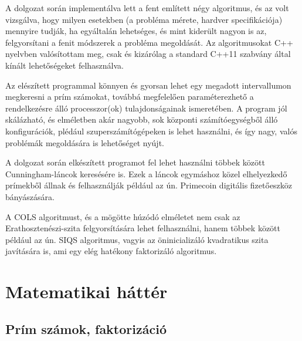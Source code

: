 \documentclass[twoside, a4paper, 12pt]{article}
\begin{document}
A dolgozat során implementálva lett a fent említett négy algoritmus, és az volt vizsgálva, hogy milyen esetekben (a probléma mérete, hardver specifikációja) mennyire tudják, ha egyáltalán lehetséges, és mint kiderült nagyon is az, felgyorsítani a fenit módszerek a probléma megoldását. Az algoritmusokat C++ nyelvben valósítottam meg, csak és kizárólag a standard C++11 szabvány által kínált lehetőségeket felhasználva.\par \bigskip
Az elészített programmal könnyen és gyorsan lehet egy megadott intervallumon megkeresni a prím számokat, továbbá megfelelően paraméterezhető a rendelkezésre álló processzor(ok) tulajdonságainak ismeretében. A program jól skálázható, és elméletben akár nagyobb, sok központi számítóegységből álló konfigurációk, plédául szuperszámítógépeken is lehet használni, és így nagy, valós problémák megoldására is lehetőséget nyújt. \par \bigskip
A dolgozat során elkészített programot fel lehet használni többek között Cunningham-láncok keresésére is. Ezek a láncok egymáshoz közel elhelyezkedő prímekből állnak és felhasználják például az ún. Primecoin digitális fizetőeszköz bányászására. \par \bigskip
A COLS algoritmust, és a mögötte húzódó elméletet nem csak az Erathosztenészi-szita felgyorsítására lehet felhasználni, hanem többek között például az ún. SIQS algoritmus, vagyis az öninicializáló kvadratikus szita javítására is, ami egy elég hatékony faktorizáló algoritmus.

\clearpage
\section{Matematikai háttér}

\subsection{Prím számok, faktorizáció}
\end{document}
